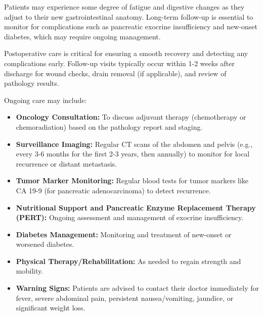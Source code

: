 Patients may experience some degree of fatigue and digestive changes as they adjust to their new gastrointestinal anatomy. Long-term follow-up is essential to monitor for complications such as pancreatic exocrine insufficiency and new-onset diabetes, which may require ongoing management.

Postoperative care is critical for ensuring a smooth recovery and detecting any complications early. Follow-up visits typically occur within 1-2 weeks after discharge for wound checks, drain removal (if applicable), and review of pathology results. 

Ongoing care may include:

\begin{itemize}
  \item \textbf{Oncology Consultation:} To discuss adjuvant therapy (chemotherapy or chemoradiation) based on the pathology report and staging.
  \item \textbf{Surveillance Imaging:} Regular CT scans of the abdomen and pelvis (e.g., every 3-6 months for the first 2-3 years, then annually) to monitor for local recurrence or distant metastasis.
  \item \textbf{Tumor Marker Monitoring:} Regular blood tests for tumor markers like CA 19-9 (for pancreatic adenocarcinoma) to detect recurrence.
  \item \textbf{Nutritional Support and Pancreatic Enzyme Replacement Therapy (PERT):} Ongoing assessment and management of exocrine insufficiency.
  \item \textbf{Diabetes Management:} Monitoring and treatment of new-onset or worsened diabetes.
  \item \textbf{Physical Therapy/Rehabilitation:} As needed to regain strength and mobility.
  \item \textbf{Warning Signs:} Patients are advised to contact their doctor immediately for fever, severe abdominal pain, persistent nausea/vomiting, jaundice, or significant weight loss.
\end{itemize}

